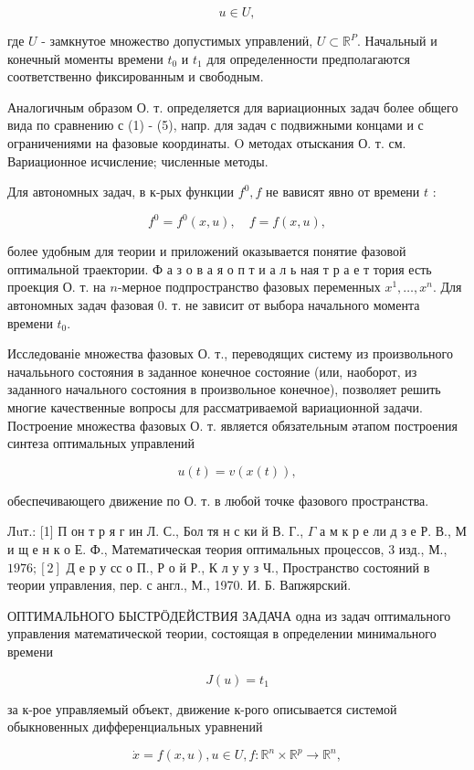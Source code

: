 \documentclass[10pt]{article}
\begin{document}
\[
u \in U,
\]

где $U$ - замкнутое множество допустимых управлениӥ, $U \subset \mathbb{R}^{P}$. Начальный и конечный моменты времени $t_{0}$ и $t_{1}$ для определенности предполагаются соответственно фиксированным и свободным.

Аналогичным образом О. т. определяется для вариационных задач более общего вида по сравнению с (1) - (5), напр. для задач с подвижными концами и с ограничениями на фазовые координаты. $\mathrm{O}$ методах отыскания О. т. см. Вариационное исчисление; численные методы.

Для автономных задач, в к-рых функции $f^{0}, f$ не вависят явно от времени $t$ :

\[
f^{0}=f^{0}(x, u), \quad f=f(x, u),
\]

более удобным для теории и приложений оказывается понятие фазовой оптимальной траектории. Ф а з о в а я о п т и а л ь ная т р а е т тория есть проекция О. т. на $n$-мерное подпространство фазовых переменных $x^{1}, \ldots, x^{n}$. Для автономных задач фазовая 0. т. не зависит от выбора начального момента времени $t_{0}$.

Исследованіе множества фазовых О. т., переводящих систему из произвольного началььного состояния в заданное конечное состояние (или, наоборот, из заданного начального состояния в произвольное конечное), позволяет решить многие качественные вопросы для рассматриваемой вариационной задачи. Построение множества фазовых О. т. является обязательным әтапом построения синтеза оптимальных управлений

\[
u(t)=v(x(t)),
\]

обеспечивающего движение по О. т. в любой точке фазового пространства.

Лuт.: [1] П он т р я г ин Л. С., Бол тя н с ки й В. Г., $\Gamma$ а м к р е ли д з е Р. В., М и щ е н к о Е. Ф., Математическая
теория оптимальных процессов, 3 изд., М., $1976 ;[2]$ Д е р у сс о П., Р о й Р., К л у у з Ч., Пространство состояний в теории управления, пер. с англ., М., 1970. И. Б. Вапжярский.

ОПТИМАЛЬНОГО БЫСТРӦДЕЙСТВИЯ ЗАДАЧА одна из задач оптимального управления математической теории, состоящая в определении минимального времени

\[
J(u)=t_{1}
\]

за к-рое управляемый объект, движение к-рого описывается системой обыкновенных дифференциальных уравнений

\[
\dot{x}=f(x, u), u \in U, f: \mathbb{R}^{n} \times \mathbb{R}^{p} \longrightarrow \mathbb{R}^{n},
\]
\end{document}
